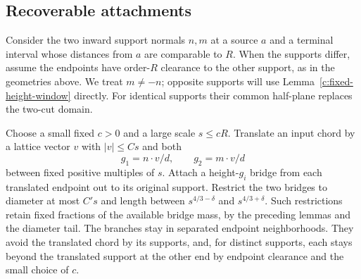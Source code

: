 \documentclass[11pt]{article}
\numberwithin{equation}{section}
\theoremstyle{definition}\newtheorem{definition}[theorem]{Definition}
\theoremstyle{remark}\newtheorem{remark}[theorem]{Remark}
\begin{document}
\subsection{Recoverable attachments}

Consider the two inward support normals $n,m$ at a source $a$ and a
terminal interval whose distances from $a$ are comparable to $R$.
When the supports differ, assume the endpoints have order-$R$ clearance
to the other support, as in the geometries above. We treat $m\ne-n$;
opposite supports will use Lemma~\ref{c:fixed-height-window} directly.
For identical supports their common half-plane replaces the two-cut
domain.

Choose a small fixed $c>0$ and a large scale $s\le cR$. Translate an
input chord by a lattice vector $v$ with $|v|\le Cs$ and both
\[
 g_1=n\cdot v/d,\qquad g_2=m\cdot v/d
\]
between fixed positive multiples of $s$. Attach a height-$g_i$ bridge
from each translated endpoint out to its original support. Restrict the
two bridges to diameter at most $C's$ and length between
$s^{4/3-\delta}$ and $s^{4/3+\delta}$. Such restrictions retain fixed
fractions of the available bridge mass, by the preceding lemmas and the
diameter tail. The branches stay in separated endpoint neighborhoods.
They avoid the translated chord by its supports, and, for distinct
supports, each stays beyond the translated support at the other end
by endpoint clearance and the small choice of $c$.
\end{document}
